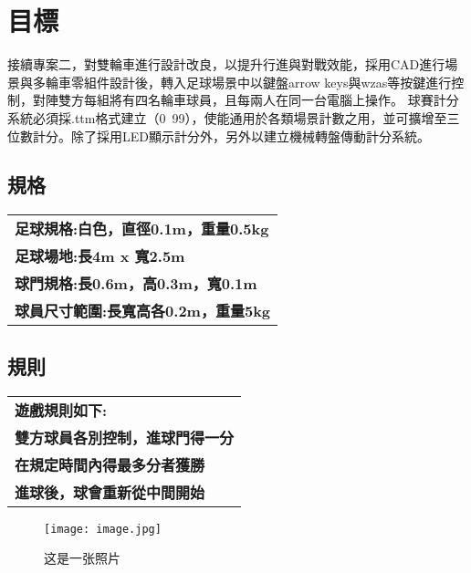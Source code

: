 \chapter{目標}
接續專案二，對雙輪車進行設計改良，以提升行進與對戰效能，採用CAD進行場景與多輪車零組件設計後，轉入足球場景中以鍵盤arrow keys與wzas等按鍵進行控制，對陣雙方每組將有四名輪車球員，且每兩人在同一台電腦上操作。
球賽計分系統必須採.ttm格式建立（0~99），使能通用於各類場景計數之用，並可擴增至三位數計分。除了採用LED顯示計分外，另外以建立機械轉盤傳動計分系統。

\section{規格}
\begin{tabular}{p{8cm}}
  \textbf{足球規格:白色，直徑0.1m，重量0.5kg} \\
  \textbf{足球場地:長4m x 寬2.5m} \\
  \textbf{球門規格:長0.6m，高0.3m，寬0.1m} \\
  \textbf{球員尺寸範圍:長寬高各0.2m，重量5kg} \\
\end{tabular}

\section{規則}
\begin{tabular}{p{8cm}}
  \textbf{遊戲規則如下:} \\
  \textbf{雙方球員各別控制，進球門得一分} \\
  \textbf{在規定時間內得最多分者獲勝} \\
  \textbf{進球後，球會重新從中間開始} \\
\end{tabular}
\begin{figure}
  \begin{center}
    \texttt{[image: image.jpg]}
  \end{center}
  \caption{这是一张照片}
  \label{fig:photo}
\end{figure}
